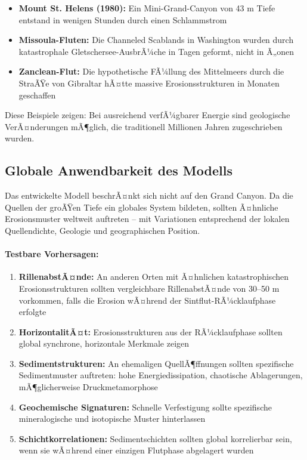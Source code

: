 ﻿\documentclass[12pt,a4paper]{report}
\begin{document}
\begin{itemize}
	\item \textbf{Mount St. Helens (1980):} Ein \glqq Mini-Grand-Canyon\grqq{} von 43 m Tiefe entstand in wenigen Stunden durch einen Schlammstrom
	
	\item \textbf{Missoula-Fluten:} Die Channeled Scablands in Washington wurden durch katastrophale Gletschersee-AusbrÃ¼che in Tagen geformt, nicht in Ã„onen
	
	\item \textbf{Zanclean-Flut:} Die hypothetische FÃ¼llung des Mittelmeers durch die StraÃŸe von Gibraltar hÃ¤tte massive Erosionsstrukturen in Monaten geschaffen
\end{itemize}

Diese Beispiele zeigen: Bei ausreichend verfÃ¼gbarer Energie sind geologische VerÃ¤n\-derungen mÃ¶glich, die traditionell Millionen Jahren zugeschrieben wurden.

\subsection{Globale Anwendbarkeit des Modells}

Das entwickelte Modell beschrÃ¤nkt sich nicht auf den Grand Canyon. Da die Quellen der groÃŸen Tiefe ein globales System bildeten, sollten Ã¤hnliche Erosionsmuster weltweit auftreten -- mit Variationen entsprechend der lokalen Quellendichte, Geologie und geographischen Position.

\paragraph{Testbare Vorhersagen:}

\begin{enumerate}
	\item \textbf{RillenabstÃ¤nde:} An anderen Orten mit Ã¤hnlichen katastrophischen Erosionsstrukturen sollten vergleichbare RillenabstÃ¤nde von 30--50 m vorkommen, falls die Erosion wÃ¤hrend der Sintflut-RÃ¼cklaufphase erfolgte
	
	\item \textbf{HorizontalitÃ¤t:} Erosionsstrukturen aus der RÃ¼cklaufphase sollten global synchrone, horizontale Merkmale zeigen
	
	\item \textbf{Sedimentstrukturen:} An ehemaligen QuellÃ¶ffnungen sollten spezifische Sedimentmuster auftreten: hohe Energiedissipation, chaotische Ablagerungen, mÃ¶glicherweise Druckmetamorphose
	
	\item \textbf{Geochemische Signaturen:} Schnelle Verfestigung sollte spezifische mineralogische und isotopische Muster hinterlassen
	
	\item \textbf{Schichtkorrelationen:} Sedimentschichten sollten global korrelierbar sein, wenn sie wÃ¤hrend einer einzigen Flutphase abgelagert wurden
\end{enumerate}
\end{document}
